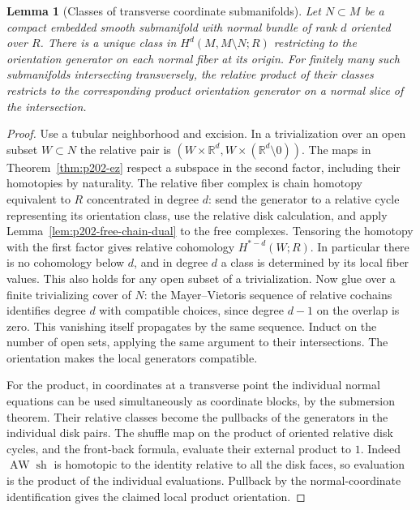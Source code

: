 \documentclass[11pt,oneside,openany]{book}
\theoremstyle{plain}
\newtheorem{lemma}[theorem]{Lemma}
\theoremstyle{definition}
\theoremstyle{remark}
\begin{document}
\begin{lemma}[Classes of transverse coordinate submanifolds]
\label{lem:p202-projective-thom}
Let \(N\subset M\) be a compact embedded smooth submanifold
with normal bundle of rank \(d\) oriented over \(R\).
There is a unique class in \(H^d(M,M\setminus N;R)\)
restricting to the orientation generator on each normal
fiber at its origin. For finitely many such submanifolds
intersecting transversely, the relative product of their
classes restricts to the corresponding product orientation
generator on a normal slice of the intersection.
\end{lemma}
\begin{proof}
Use a tubular neighborhood and excision. In a
trivialization over an open subset \(W\subset N\) the
relative pair is
\((W\times\mathbb R^d,W\times(\mathbb R^d\setminus0))\).
The maps in Theorem~\ref{thm:p202-ez} respect a subspace
in the second factor, including their homotopies by
naturality. The relative fiber complex is chain homotopy
equivalent to \(R\) concentrated in degree \(d\): send
the generator to a relative cycle representing its
orientation class, use the relative disk calculation,
and apply Lemma~\ref{lem:p202-free-chain-dual} to the
free complexes. Tensoring the homotopy with the first
factor gives relative cohomology \(H^{*-d}(W;R)\).
In particular there is no cohomology below \(d\), and
in degree \(d\) a class is determined by its local
fiber values. This also holds for any open subset of a
trivialization. Now glue over a finite trivializing
cover of \(N\): the Mayer--Vietoris sequence of relative
cochains identifies degree \(d\) with compatible choices,
since degree \(d-1\) on the overlap is zero. This
vanishing itself propagates by the same sequence.
Induct on the number of open sets, applying the
same argument to their intersections. The orientation
makes the local generators compatible.

For the product, in coordinates at a transverse point
the individual normal equations can be used simultaneously
as coordinate blocks, by the submersion theorem.
Their relative classes become the pullbacks of the
generators in the individual disk pairs. The shuffle
map on the product of oriented relative disk cycles,
and the front-back formula, evaluate their external
product to \(1\). Indeed \(\operatorname{AW}\operatorname{sh}\)
is homotopic to the identity relative to all the disk
faces, so evaluation is the product of the individual
evaluations. Pullback by the normal-coordinate
identification gives the claimed local product orientation.
\end{proof}
\end{document}
